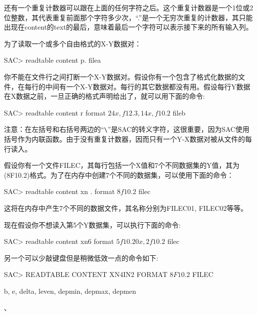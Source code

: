 还有一个重复计数器可以跟在上面的任何字符之后。这个重复计数器是一个1位或2位整数，其代表重复前面那个字符多少次，``.''是一个无穷次重复的计数器，其只能出现在content的text的最后，意味着最后一个字符可以表示接下来的所有输入列。

为了读取一个或多个自由格式的X-Y数据对：
\begin{SACCode}
SAC> readtable content p. filea
\end{SACCode}

你不能在文件行之间打断一个X-Y数据对。假设你有一个包含了格式化数据的文件，在每行的中间有一个X-Y数据对。每行的其它数据都没有用。假设每行Y数据在X数据之前，一旦正确的格式声明给出了，就可以用下面的命令:
\begin{SACCode}
SAC> readtable content r format \(24x,f12.3,14x,f10.2\) fileb
\end{SACCode}
注意：在左括号和右括号两边的``\verb+\+''是SAC的转义字符，这很重要，因为SAC使用括号作为内联函数。由于没有重复计数器，因而只有一个Y-X数据对被从文件的每行读入。

假设你有一个文件FILEC，其每行包括一个X值和7个不同数据集的Y值，其为(8F10.2)格式。为了在内存中创建7个不同的数据集，可以使用下面的命令：
\begin{SACCode}
SAC> readtable content xn . format \(8f10.2\) filec
\end{SACCode}
这将在内存中产生7个不同的数据文件，其名称分别为FILEC01, FILEC02等等。

现在假设你不想读入第5个Y数据集，可以执行下面的命令:
\begin{SACCode}
SAC> readtable content xn6 format \(5f10.20x,2f10.2\) filec
\end{SACCode}
另一个可以少敲键盘但是稍微低效一点的命令如下:
\begin{SACCode}
SAC> READTABLE CONTENT XN4IN2 FORMAT \(8F10.2\) FILEC
\end{SACCode}

b, e, delta, leven, depmin, depmax, depmen

、
